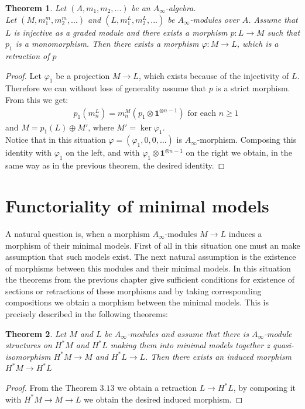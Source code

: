 \documentclass[a4paper, 12pt, openany, fleqn]{amsart}
\newtheorem{theorem}{Theorem}[section]
\begin{document}
\begin{theorem}
    Let $(A,m_1,m_2,...)$ be an $A_\infty$-algebra.\\ Let $(M,m_1^m,m_2^m,...)$ and $(L,m_1^L,m_2^L,...)$ be $A_\infty$-modules over $A$. Assume that $L$ is injective as a graded module and there exists a morphism $p:L\longrightarrow M$ such that $p_1$ is a monomorphism. Then there exists a morphism $\varphi :M\longrightarrow L$, which is a retraction of $p$
\end{theorem}
\begin{proof} Let $\varphi_1$ be a projection $M\longrightarrow L$, which exists because of the injectivity of $L$. Therefore we can without loss of generality assume that $p$ is a strict morphism. From this we get:
\begin{align*}
    &p_1(m_n^{L}) = m_n^M(p_1\otimes\mathbf{1}^{\otimes n-1}) \text{ for each } n\geq 1
\end{align*}
and $M = p_1(L)\oplus M'$, where $M' = \ker{\varphi_1}$.\\
Notice that in this situation $\varphi = (\varphi_1,0,0,\dots)$ is $A_\infty$-morphism. Composing this identity with $\varphi_1$ on the left, and with $\varphi_1\otimes\mathbf{1}^{\otimes n-1}$ on the right we obtain, in the same way as in the previous theorem, the desired identity.
\end{proof}

\section{Functoriality of minimal models}
A natural question is, when a morphism $A_\infty$-modules $M\longrightarrow L$ induces a morphism of their minimal models. First of all in this situation one must an make assumption that such models exist. The next natural assumption is the existence of morphisms between this modules and their minimal models. In this situation the theorems from the previous chapter give sufficient conditions for existence of sections or retractions of these morphisms and by taking corresponding compositions we obtain a morphism between the minimal models. This is precisely described in the following theorems:
\begin{theorem}
    Let $M$ and $L$ be $A_\infty$-modules and assume that there is  $A_\infty$-module structures on $H^*M$ and $H^*L$ making them into minimal models together z quasi-isomorphism $H^*M\longrightarrow M$ and $H^*L \longrightarrow L$. Then there exists an induced morphism $H^*M\longrightarrow H^*L$ 
\end{theorem}
\begin{proof}
    From the Theorem $3.13$ we obtain a retraction $L\longrightarrow H^*L$, by composing it with $H^*M\longrightarrow M \longrightarrow L$ we obtain the desired induced morphism.
\end{proof}
\end{document}
